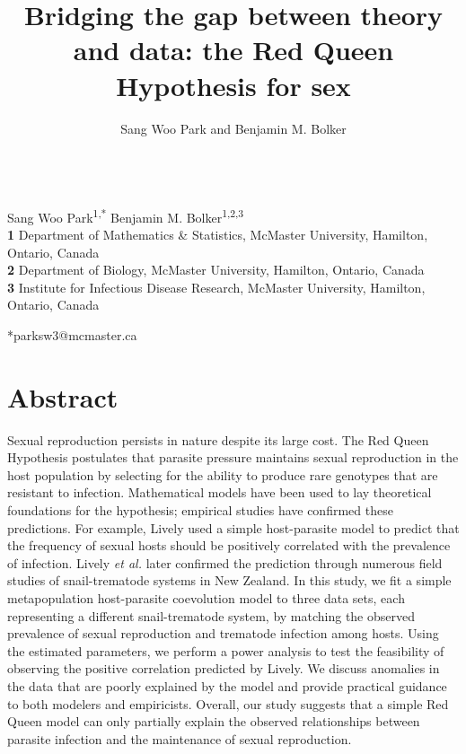 \documentclass{article}\usepackage[]{graphicx}\usepackage[]{color}
\title{Bridging the gap between theory and data: the Red Queen Hypothesis for sex}
\author{Sang Woo Park and Benjamin M. Bolker}
\date{}
\begin{document}
\begin{flushleft}{
	\Large
	\textbf{}
}
\newline
\\
Sang Woo Park\textsuperscript{1,*}
Benjamin M. Bolker\textsuperscript{1,2,3}
\\

\bigskip
\textbf{1} Department of Mathematics \& Statistics, McMaster University, Hamilton, Ontario, Canada
\\
\textbf{2} Department of Biology, McMaster University, Hamilton, Ontario, Canada
\\
\textbf{3} Institute for Infectious Disease Research, McMaster University, Hamilton, Ontario, Canada
\bigskip

*parksw3@mcmaster.ca
\end{flushleft} 

\section*{Abstract}

Sexual reproduction persists in nature despite its large cost.
The Red Queen Hypothesis postulates that parasite pressure maintains sexual reproduction in the host population by selecting for the ability to produce rare genotypes that are resistant to infection.
Mathematical models have been used to lay theoretical foundations for the hypothesis; empirical studies have confirmed these predictions.
For example, Lively used a simple host-parasite model to predict that the frequency of sexual hosts should be positively correlated with the prevalence of infection. 
Lively \textit{et al.} later confirmed the prediction through numerous field studies of snail-trematode systems in New Zealand.
In this study, we fit a simple metapopulation host-parasite coevolution model to three data sets, each representing a different snail-trematode system, by matching the observed prevalence of sexual reproduction and trematode infection among hosts.
Using the estimated parameters, we perform a power analysis to test the feasibility of observing the positive correlation predicted by Lively.
We discuss anomalies in the data that are poorly explained by the model and provide practical guidance to both modelers and empiricists.
Overall, our study suggests that a simple Red Queen model can only partially explain the observed relationships between parasite infection and the maintenance of sexual reproduction.
\end{document}
